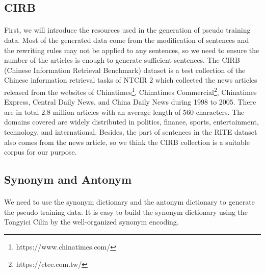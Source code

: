 \documentclass{article}
\begin{document}
\begin{CJK*}{UTF8}{bkai}
\subsection{CIRB}
\paragraph{}
First, we will introduce the resources used in the generation of pseudo training data. Most of the generated data come from the modification of sentences and the rewriting rules may not be applied to any sentences, so we need to ensure the number of the articles is enough to generate sufficient sentences. The CIRB (Chinese Information Retrieval Benchmark)\cite{chen2001cirb} dataset is a test collection of the Chinese information retrieval tasks of NTCIR 2 which collected the news articles released from the websites of Chinatimes\footnote{https://www.chinatimes.com/}, Chinatimes Commercial\footnote{https://ctee.com.tw/}, Chinatimes Express, Central Daily News, and China Daily News during 1998 to 2005. There are in total 2.8 million articles with an average length of 560 characters. The domains covered are widely distributed in politics, finance, sports, entertainment, technology, and international. Besides, the part of sentences in the RITE dataset also comes from the news article, so we think the CIRB collection is a suitable corpus for our purpose.

\subsection{Synonym and Antonym}
\paragraph{}
We need to use the synonym dictionary and the antonym dictionary to generate the pseudo training data. It is easy to build the synonym dictionary using the Tongyici Cilin by the well-organized synonym encoding.


\end{CJK*}
\end{document}
